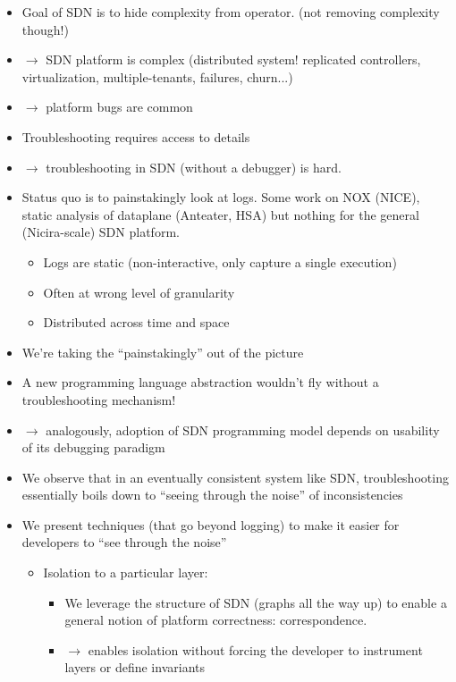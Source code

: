 \begin{itemize}
\item Goal of SDN is to hide complexity from operator. (not removing
complexity though!) 
\item $\rightarrow$ SDN platform is complex (distributed system! replicated controllers,
virtualization, multiple-tenants, failures, churn...)
\item $\rightarrow$ platform bugs are common
\item Troubleshooting requires access to details
\item $\rightarrow$ troubleshooting in SDN (without a debugger) is hard.
\item Status quo is to painstakingly look at logs. Some work on NOX (NICE), static
analysis of dataplane (Anteater, HSA) but nothing for the general
(Nicira-scale) SDN platform.
    \begin{itemize}
    \item Logs are static (non-interactive, only capture a single execution)
    \item Often at wrong level of granularity
    \item Distributed across time and space
    \end{itemize}
\item We're taking the ``painstakingly'' out of the picture
\item A new programming language abstraction wouldn't fly without a troubleshooting
mechanism!
\item $\rightarrow$ analogously, adoption of SDN programming model depends on usability of its
debugging paradigm  
\item We observe that in an eventually consistent system like SDN,
troubleshooting essentially boils down to ``seeing through the noise'' of
inconsistencies
\item We present techniques (that go beyond logging) to make it easier for
developers to ``see through the noise''
    \begin{itemize}
    \item Isolation to a particular layer:
        \begin{itemize}
        \item We leverage the structure of SDN (graphs all the way up) to
        enable a general notion of platform correctness: correspondence.
        \item $\rightarrow$ enables isolation without forcing the developer to
        instrument layers or define invariants

\end{itemize}
\end{itemize}
\end{itemize}
